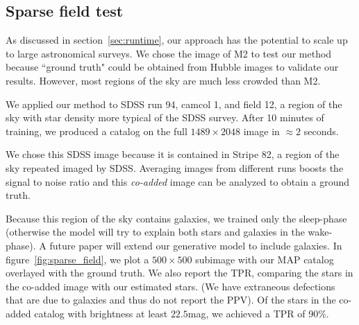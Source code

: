 
\subsection{Sparse field test}
As discussed in section~\ref{sec:runtime}, our approach has the potential 
to scale up to large astronomical surveys. We chose the image of M2 to 
test our method because ``ground truth" could be obtained from Hubble images 
to validate our results. However, most regions of the sky are much less 
crowded than M2. 

We applied our method to SDSS run 94, camcol 1, and field  12, 
a region of the sky with star density more typical of the SDSS survey. 
After 10 minutes of training, we produced a catalog on the full $1489\times 2048$ image in $\approx2$ seconds. 

We chose this SDSS image because it is contained in Stripe 82, a region of the sky repeated imaged by SDSS. Averaging images from different runs boosts the signal to noise ratio and this {\itshape co-added} image can be analyzed to obtain a ground truth. 

Because this region of the sky contains galaxies, we trained only the sleep-phase (otherwise the model will try to explain both stars and galaxies in the wake-phase). 
A future paper will extend our generative model to include galaxies. In 
figure~\ref{fig:sparse_field}, we plot a $500\times 500$ subimage with 
our MAP catalog overlayed with the ground truth. We also report the 
TPR, comparing the stars in the co-added image with our estimated stars. (We have extraneous defections that are due to galaxies and thus 
do not report the PPV). Of the stars in the co-added catalog with brightness at least $22.5$mag, we achieved a TPR of 90\%. 



